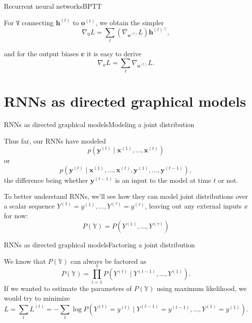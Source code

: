 \documentclass{beamer}
\renewcommand{\vec}[1]{\boldsymbol{#1}}
\newcommand{\mat}[1]{\mathtt{#1}}
\newcommand{\T}[0]{\top}
\newcommand{\myfig}[3]{\centerline{\texttt{[image: \{\#2]}}}
    \centerline{\scriptsize #3}}
\begin{document}
\begin{frame}{Recurrent neural networks}{BPTT}

  For $\mat{V}$ connecting $\vec{h}^{(t)}$ to $\vec{o}^{(t)}$, we
  obtain the simpler
  \[ \nabla_{\mat{U}}L = \sum_t (\nabla_{\vec{o}^{(t)}}L)\vec{h}^{(t)\T}, \]

  and for the output biases $\vec{c}$ it is easy to derive
  \[ \nabla_{\vec{c}}L = \sum_t \nabla_{\vec{o}^{(t)}}L. \]
  
\end{frame}


\section{RNNs as directed graphical models}

\begin{frame}{RNNs as directed graphical models}{Modeling a joint distribution}

  Thus far, our RNNs have modeled
  \[ p(\vec{y}^{(t)} \mid \vec{x}^{(1)}, \ldots, \vec{x}^{(t)}) \]
  or
  \[ p(\vec{y}^{(t)} \mid \vec{x}^{(1)}, \ldots, \vec{x}^{(t)},
  \vec{y}^{(1)}, \ldots, \vec{y}^{(t-1)}), \] the difference being
  whether $\vec{y}^{(t-1)}$ is an input to the model at time $t$ or
  not.

  \medskip

  To better understand RNNs, we'll see how they can model joint
  distributions over a scalar sequence $Y^{(1)}=y^{(1)},\ldots,Y^{(\tau)}=y^{(\tau)}$,
  leaving out any external inputs $x$ for now:
  \[ P(\mathbb{Y}) = P(Y^{(1)},\ldots,Y^{(\tau)}) \]
  
\end{frame}


\begin{frame}{RNNs as directed graphical models}{Factoring a joint distribution}

  We know that $P(\mathbb{Y})$ can always be factored as
  \[ P(\mathbb{Y}) = \prod_{i=1}^\tau P(Y^{(t)} \mid Y^{(t-1)}, \ldots, Y^{(1)}). \]
  If we wanted to estimate the parameters of $P(\mathbb{Y})$ using maximum
  likelihood, we would try to minimize
  \[ L = \sum_t L^{(t)} = -\sum_t \log P(Y^{(t)}=y^{(t)} \mid
     Y^{(t-1)}=y^{(t-1)},\ldots,
     Y^{(1)}=y^{(1)}).\]
\end{frame}
\end{document}

